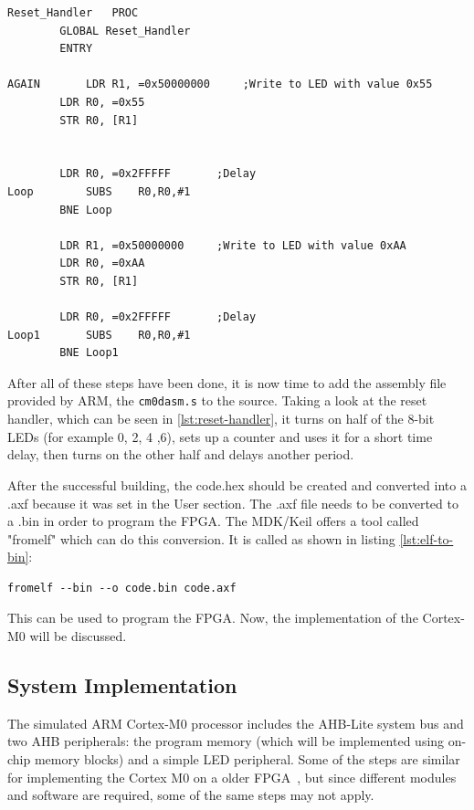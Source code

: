 \begin{lstlisting}[caption={Reset Handler},label={lst:reset-handler}]
Reset_Handler	PROC
		GLOBAL Reset_Handler
		ENTRY

AGAIN		LDR	R1, =0x50000000		;Write to LED with value 0x55
		LDR	R0, =0x55
		STR	R0, [R1]


		LDR	R0, =0x2FFFFF		;Delay
Loop		SUBS	R0,R0,#1
		BNE Loop

		LDR	R1, =0x50000000		;Write to LED with value 0xAA
		LDR	R0, =0xAA
		STR	R0, [R1]

		LDR	R0, =0x2FFFFF		;Delay
Loop1		SUBS	R0,R0,#1
		BNE Loop1
\end{lstlisting}

After all of these steps have been done, it is now time to add the assembly file provided by ARM, the \verb|cm0dasm.s| to the source. Taking a look at the reset handler, which can be seen in \ref{lst:reset-handler}, it turns on half of the 8-bit LEDs (for example 0, 2, 4 ,6), sets up a counter and uses it for a short time delay, then turns on the other half and delays another period.

After the successful building, the code.hex should be created and converted into a .axf because it was set in the User section. The .axf file needs to be converted to a .bin in order to program the FPGA. The MDK/Keil offers a tool called "fromelf" which can do this conversion. It is called as shown in listing \ref{lst:elf-to-bin}:

\begin{lstlisting}[caption={Creating a bin file from ELF Format},label={lst:elf-to-bin}]
fromelf --bin --o code.bin code.axf
\end{lstlisting}

This can be used to program the FPGA. Now, the implementation of the Cortex-M0 will be discussed.

\subsection{System Implementation}

The simulated ARM Cortex-M0 processor includes the AHB-Lite system bus and two AHB peripherals: the program memory (which will be implemented using on-chip memory blocks) and a simple LED peripheral. Some of the steps are similar for implementing the Cortex M0 on a older FPGA~\cite{implementationcortexm0onnexys2}, but since different modules and software are required, some of the same steps may not apply.


